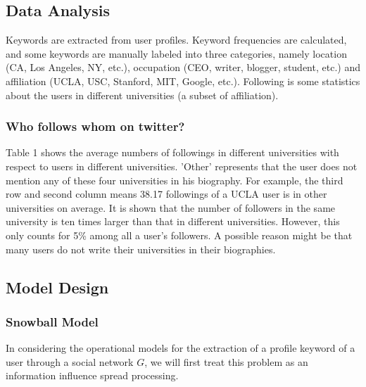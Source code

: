 \documentclass{article}
\begin{document}
\subsection{Data Analysis}
Keywords are extracted from user profiles. Keyword frequencies are calculated, and some keywords are manually labeled into three categories, namely location (CA, Los Angeles, NY, etc.), occupation (CEO, writer, blogger, student, etc.) and affiliation (UCLA, USC, Stanford, MIT, Google, etc.). Following is some statistics about the users in different universities (a subset of affiliation).

\subsubsection{Who follows whom on twitter?}
Table 1 shows the average numbers of followings in different universities with respect to users in different universities. 'Other' represents that the user does not mention any of these four universities in his biography. For example, the third row and second column means 38.17 followings of a UCLA user is in other universities on average. It is shown that the number of followers in the same university is ten times larger than that in different universities. However, this only counts for 5\% among all a user's followers. A possible reason might be that many users do not write their universities in their biographies.



\subsection{Model Design}

\subsubsection{Snowball Model}
In considering the operational models for the extraction of a profile keyword of a user through a social network $G$, we will first treat this problem as an information influence spread processing.
\end{document}
